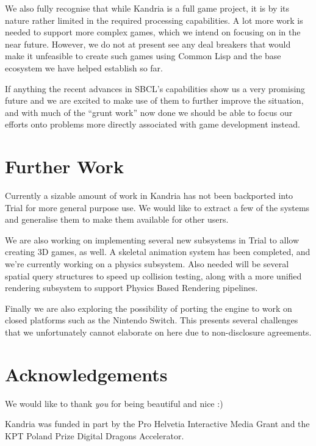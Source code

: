 \documentclass[format=sigconf]{acmart}
\begin{document}
We also fully recognise that while Kandria is a full game project, it is by its nature rather limited in the required processing capabilities. A lot more work is needed to support more complex games, which we intend on focusing on in the near future. However, we do not at present see any deal breakers that would make it unfeasible to create such games using Common Lisp and the base ecosystem we have helped establish so far.

If anything the recent advances in SBCL's capabilities show us a very promising future and we are excited to make use of them to further improve the situation, and with much of the ``grunt work'' now done we should be able to focus our efforts onto problems more directly associated with game development instead.

\section{Further Work}\label{further-work}
Currently a sizable amount of work in Kandria has not been backported into Trial for more general purpose use. We would like to extract a few of the systems and generalise them to make them available for other users.

We are also working on implementing several new subsystems in Trial to allow creating 3D games, as well. A skeletal animation system has been completed, and we're currently working on a physics subsystem. Also needed will be several spatial query structures to speed up collision testing, along with a more unified rendering subsystem to support Physics Based Rendering pipelines.

Finally we are also exploring the possibility of porting the engine to work on closed platforms such as the Nintendo Switch. This presents several challenges that we unfortunately cannot elaborate on here due to non-disclosure agreements.

\section{Acknowledgements}\label{acknowledgements}
We would like to thank \textit{you} for being beautiful and nice :)

Kandria was funded in part by the Pro Helvetia Interactive Media Grant and the KPT Poland Prize Digital Dragons Accelerator.

\end{document}
